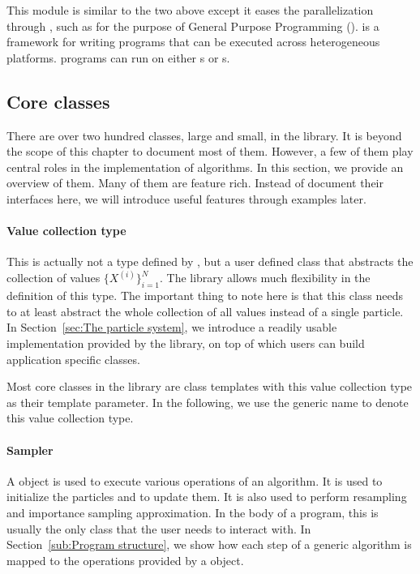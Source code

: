 This module is similar to the two above except it eases the parallelization through \opencl, such as for the purpose of General Purpose \gpu Programming (\gpgpu). \opencl is a framework for writing programs that can be executed across heterogeneous platforms. \opencl programs can run on either \cpu{}s or \gpu{}s.

\subsection{Core classes}
\label{sub:Core classes}

There are over two hundred classes, large and small, in the \vsmc library. It is beyond the scope of this chapter to document most of them. However, a few of them play central roles in the implementation of \smc algorithms. In this section, we provide an overview of them. Many of them are feature rich. Instead of document their interfaces here, we will introduce useful features through examples later.

\paragraph{Value collection type}

This is actually not a type defined by \vsmc, but a user defined class that abstracts the collection of values $\{X^{(i)}\}_{i=1}^N$. The library allows much flexibility in the definition of this type. The important thing to note here is that this class needs to at least abstract the whole collection of all values instead of a single particle. In Section~\ref{sec:The particle system}, we introduce a readily usable implementation provided by the \vsmc library, on top of which users can build application specific classes.

Most core classes in the library are class templates with this value collection type as their template parameter. In the following, we use the generic name  to denote this value collection type.

\paragraph{Sampler}

A  object is used to execute various operations of an \smc algorithm. It is used to initialize the particles and to update them. It is also used to perform resampling and importance sampling approximation. In the body of a program, this is usually the only class that the user needs to interact with. In Section~\ref{sub:Program structure}, we show how each step of a generic \smc algorithm is mapped to the operations provided by a  object.

